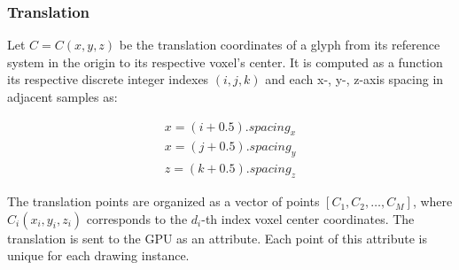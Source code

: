 \documentclass[twoside,twocolumn,10pt]{article}
\begin{document}


\subsubsection{Translation}

Let $C= C(x, y, z)$ be the translation coordinates of a glyph from its reference system in the origin to its respective voxel's center. It is computed as a function its respective discrete integer indexes $(i, j, k)$ and each x-, y-, z-axis spacing in adjacent samples as:


\begin{align}
 \label{eq::translation}
    x = (i + 0.5).spacing_x \nonumber\\
    x = (j + 0.5).spacing_y \\
    z = (k + 0.5).spacing_z \nonumber
\end{align}


The translation points are organized as a vector of points $[C_1,C_2, \dots, C_M]$, where $C_i(x_i, y_i, z_i)$ corresponds to the $d_i$-th index voxel center coordinates. The translation is sent to the GPU as an attribute. Each point of this attribute is unique for each drawing instance.




\end{document}

